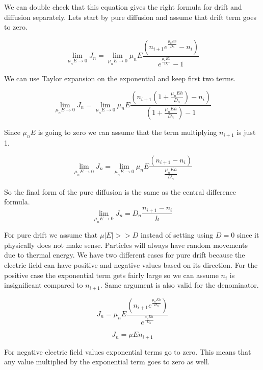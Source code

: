 We can double check that this equation gives the right formula for drift and diffusion separately. Lets start by pure diffusion and assume that drift term goes to zero.

\begin{equation}
\lim\limits_{\mu_n E \rightarrow 0}J_n=\lim\limits_{\mu_n E \rightarrow 0}\mu_n E\frac{(n_{i+1}e^{\frac{\mu_n E h}{D_n}}-n_i)}{e^{\frac{\mu_n E h}{D_n}}-1}
\end{equation}

We can use Taylor expansion on the exponential and keep first two terms.

\begin{equation}
\lim\limits_{\mu_n E \rightarrow 0}J_n=\lim\limits_{\mu_n E \rightarrow 0}\mu_n E\frac{(n_{i+1}(1+\frac{\mu_n E h}{D_n})-n_i)}{(1+\frac{\mu_n E h}{D_n})-1}
\end{equation}

Since $\mu_n E$ is going to zero we can assume that the term multiplying $n_{i+1}$ is just 1.

\begin{equation}
\lim\limits_{\mu_n E \rightarrow 0}J_n=\lim\limits_{\mu_n E \rightarrow 0}\mu_n E\frac{(n_{i+1}-n_i)}{\frac{\mu_n E h}{D_n}}
\end{equation}

So the final form of the pure diffusion is the same as the central difference formula.
\begin{equation}
\lim\limits_{\mu_n E \rightarrow 0}J_n=D_n\frac{n_{i+1}-n_i}{h}
\end{equation}

For pure drift we assume that $\mu |E| >> D$ instead of setting using $D=0$ since it physically does not make sense. Particles will always have random movements due to thermal energy. We have two different cases for pure drift because the electric field can have positive and negative values based on its direction. For the positive case the exponential term gets fairly large so we can assume $n_i$ is insignificant compared to $n_{i+1}$. Same argument is also valid for the denominator.

\begin{equation}
J_n =\mu_n E\frac{(n_{i+1}e^{\frac{\mu_n E h}{D_n}})}{e^{\frac{\mu_n E h}{D_n}}}
\end{equation}

\begin{equation}
J_n=\mu E n_{i+1} 
\end{equation}

For negative electric field values exponential terms go to zero. This means that any value multiplied by the exponential term goes to zero as well.

